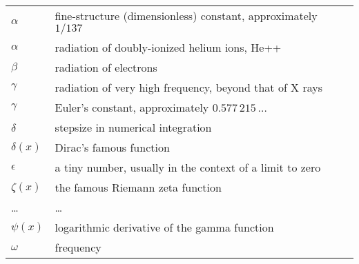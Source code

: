 
\begin{tabular}{ll}
    \hline
    $\alpha$      & fine-structure (dimensionless) constant, approximately $1 / 137$ \\
    $\alpha$      & radiation of doubly-ionized helium ions, He++ \\
    $\beta$       & radiation of electrons \\
    $\gamma$      & radiation of very high frequency, beyond that of X rays \\
    $\gamma$      & Euler's constant, approximately $0.577\,215\,\ldots{}$  \\
    $\delta$      & stepsize in numerical integration \\
    $\delta(x)$   & Dirac's famous function \\
    $\epsilon$    & a tiny number, usually in the context of a limit to zero \\
    $\zeta(x)$    & the famous Riemann zeta function \\
    \ldots{}      & \ldots{}  \\
    $\psi(x)$     & logarithmic derivative of the gamma function \\
    $\omega$      & frequency \\
    \hline
\end{tabular}
